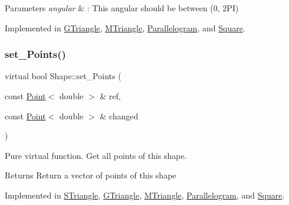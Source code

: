 \begin{DoxyParams}{Parameters}
{\em angular} & \+: This angular should be between (0, 2\+PI) \\
\hline
\end{DoxyParams}


Implemented in \hyperlink{classGTriangle_ae3ed75bbad4ba7fed68bc06c5834cfbe}{G\+Triangle}, \hyperlink{classMTriangle_a4be29553eeddf99c367b1ec220bc102b}{M\+Triangle}, \hyperlink{classParallelogram_ac498f6a15dea236ecc49bece023d17b0}{Parallelogram}, and \hyperlink{classSquare_a5714e182c30f996b78e74e1badd054a2}{Square}.

\mbox{\label{classShape_a6eb0d80cccc44cb72b06c61d9780bc6b}} 
\subsubsection{\texorpdfstring{set\+\_\+\+Points()}{set\_Points()}}
{\footnotesize\ttfamily virtual bool Shape\+::set\+\_\+\+Points (\begin{DoxyParamCaption}\item[{const \hyperlink{classPoint}{Point}$<$ double $>$ \&}]{ref,  }\item[{const \hyperlink{classPoint}{Point}$<$ double $>$ \&}]{changed }\end{DoxyParamCaption})\hspace{0.3cm}{\ttfamily [pure virtual]}}



Pure virtual function. Get all points of this shape. 

\begin{DoxyReturn}{Returns}
Return a vector of points of this shape 
\end{DoxyReturn}


Implemented in \hyperlink{classSTriangle_acab6926951bd8f2558e4c658610c0e51}{S\+Triangle}, \hyperlink{classGTriangle_adb9dae329128600209c54cc4587480ee}{G\+Triangle}, \hyperlink{classMTriangle_aec40d088d077bfb14f94895be871dfdf}{M\+Triangle}, \hyperlink{classParallelogram_ab74583703a60e4b798d7048aa684f44e}{Parallelogram}, and \hyperlink{classSquare_ac474644483fa85f7a4f39969f34868fe}{Square}.

\mbox{\label{classShape_a98fa87c6dc4c7045fd6897a8f3bc186c}} 
